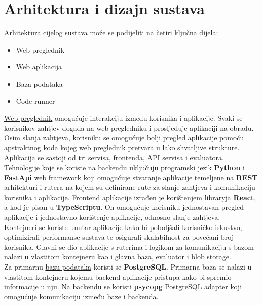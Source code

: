 \chapter{Arhitektura i dizajn sustava}
	{Arhitektura cijelog sustava može se podijeliti na četiri ključna dijela:}
		\begin{itemize}
    		\item Web preglednik
    		\item Web aplikacija
    		\item Baza podataka
    		\item Code runner
		\end{itemize}

	{\underline{Web preglednik} omogućuje interakciju između korisnika i aplikacije. Svaki se korisnikov zahtjev
	 događa na web pregledniku i prosljeđuje aplikaciji na obradu. Osim slanja zahtjeva, korisniku se omogućuje
	  bolji pregled aplikacije pomoću apstraktnog koda kojeg web preglednik pretvara u lako shvatljive strukture.}\\

	{\underline{Aplikacija} se sastoji od tri  servisa, frontenda, API servisa i evaluatora. Tehnologije koje se koriste na backendu
	 uključuju programski jezik \textbf{Python} i \textbf{FastApi} web framework koji omogućuje stvaranje aplikacije temeljene na \textbf{REST}
	 arhitekturi i rutera na kojem su definirane rute za slanje zahtjeva i komunikaciju korisnika i aplikacije.
	 Frontend aplikacije izrađen je korištenjem libraryja \textbf{React}, a kod je pisan u \textbf{TypeScriptu}. On omogućuje korisniku jednostavan pregled
	 aplikacije i jednostavno korištenje aplikacije, odnosno slanje zahtjeva.}\\

	{\underline{Kontejneri} se koriste unutar aplikacije kako bi poboljšali korisničko iskustvo, optimizirali performanse sustava
	te osigurali skalabilnost za povećani broj korisnika. Glavni se dio aplikacije s ruterima i logikom za komunikaciju s 
	bazom nalazi u vlastitom kontejneru kao i glavna baza, evaluator i blob storage.}\\

	{Za primarnu \underline{bazu podataka} koristi se \textbf{PostgreSQL}. Primarna baza se nalazi u vlastitom kontejneru kojemu backend
	aplikacije pristupa kako bi spremio informacije u nju. Na backendu se koristi \textbf{psycopg} PostgreSQL adapter koji omogućuje
	komunikaciju između baze i backenda.}\\
	
